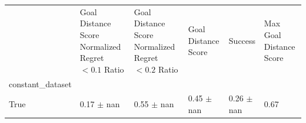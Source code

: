 \begin{tabular}{llllll}
\toprule
 & Goal Distance Score Normalized Regret $< 0.1$ Ratio & Goal Distance Score Normalized Regret $< 0.2$ Ratio & Goal Distance Score & Success & Max Goal Distance Score \\
constant_dataset &  &  &  &  &  \\
\midrule
True & 0.17 $\pm$ nan & 0.55 $\pm$ nan & 0.45 $\pm$ nan & 0.26 $\pm$ nan & 0.67 \\
\bottomrule
\end{tabular}
